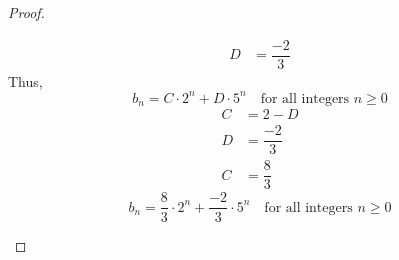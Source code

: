 \begin{proof}
\begin{enumerate}
\begin{align*}
                D &= \dfrac{-2}{3}
            \end{align*}
            Thus,
            \begin{equation*}
                b_n = C\cdot 2^n + D\cdot 5^n \quad \text{for all integers $n \geq 0$}
            \end{equation*}
            \vspace{-\baselineskip}
            \begin{align*}
                C &= 2 - D \\
                D &= \dfrac{-2}{3} \\
                C &= \dfrac{8}{3}
            \end{align*}
            \vspace{-\baselineskip}
            \begin{equation*}
                b_n = \dfrac{8}{3}\cdot 2^n + \dfrac{-2}{3}\cdot 5^n \quad \text{for all integers $n \geq 0$}
            \end{equation*}
    \end{enumerate}
\end{proof}

